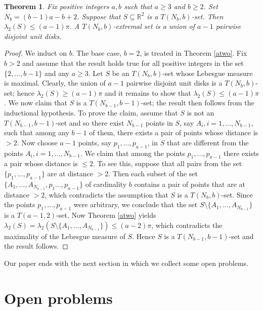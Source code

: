 \documentclass[12pt]{article}
\newtheorem{thm}{Theorem}[section]
\begin{document}
\begin{thm} Fix positive integers $a,b$ such that $a\geq 3$ and $b\geq 2$. 
Set $N_b=(b-1)a-b+2$. Suppose that $S\subseteq \mathbb{R}^2$ is a $T(N_b,b)$-set.
Then $\lambda_2(S)\leq (a-1)\pi$. A $T(N_b,b)$-extremal set 
is a union of $a-1$ pairwise disjoint unit disks.
\end{thm}
\begin{proof} 
We induct on $b$.
The base case, $b=2$, is treated in Theorem \ref{atwo}. Fix $b>2$ and
assume that the result holds true for all positive integers in the set $\{2,\ldots,b-1\}$ and any $a\geq 3$. 
Let $S$ be an $T(N_b,b)$-set  whose Lebesgue 
measure is maximal. Clearly, the union of $a-1$ pairwise disjoint 
unit disks is a $T(N_b,b)$-set; hence $\lambda_2(S)\geq (a-1)\pi$ and it remains to 
show that $\lambda_2(S)\leq (a-1)\pi$. We now claim that $S$ is a $T(N_{b-1},b-1)$-set;
the result then follows from the inductional hypothesis. 
To prove the claim, assume that $S$ is not an $T(N_{b-1},b-1)$-set and so there exist 
$N_{b-1}$ points in $S$, say $A_i,i=1,\ldots,N_{b-1}$, such that among any $b-1$ of them, 
there exists a pair of points whose distance is $>2$. 
Now choose $a-1$ points, say $p_1,\ldots,p_{a-1}$, in $S$ that 
are different from the points $A_i,i=1,\ldots,N_{b-1}$. 
We claim that among the points $p_1,\ldots,p_{a-1}$  there exists a pair whose distance is $\leq 2$.
To see this, suppose that all pairs from the set  $\{p_1,\ldots,p_{a-1}\}$ are at distance $>2$. 
Then each subset of  
the set $\{A_1,\ldots,A_{N_{b-1}},p_1\ldots, p_{a-1}\}$ of cardinality $b$ contains
a pair of points that are at distance $>2$, which
contradicts  the assumption that $S$ is a $T(N_b,b)$-set. 
Since the points $p_1,\ldots,p_{a-1}$ were arbitrary, we conclude that
the set $S\setminus \{A_1,\ldots,A_{N_{b-1}}\}$ is a $T(a-1,2)$-set.  
Now Theorem \ref{atwo} yields
$\lambda_2(S) = \lambda_2(S\setminus \{A_1,\ldots,A_{N_{b-1}}\})\leq (a-2)\pi$, which 
contradicts the maximality of 
the Lebesgue measure of $S$. Hence $S$ is a $T(N_{b-1},b-1)$-set and the result follows.
\end{proof}



Our paper ends with the next section in which  
we collect some open problems.   


\section{Open problems}\label{conjecture}
\end{document}
